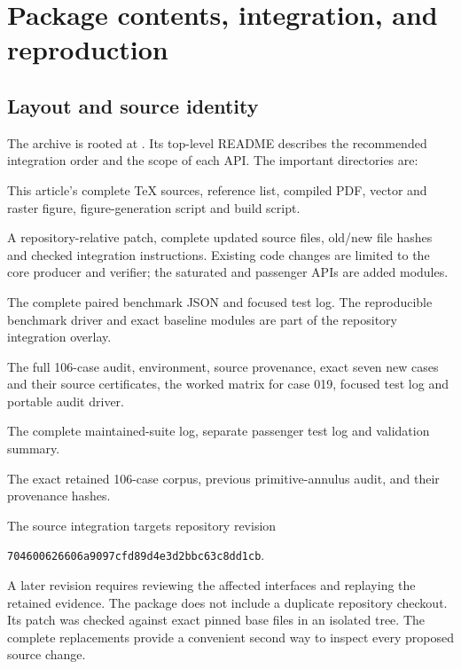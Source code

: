 \section{Package contents, integration, and reproduction}
\label{sec:reproduction}

\subsection{Layout and source identity}

The archive is rooted at
.
Its top-level README describes the recommended integration order and
the scope of each API. The important directories are:
\begin{description}[style=nextline,leftmargin=1em]
\item[\path{article/}]
This article's complete TeX sources, reference list, compiled PDF,
vector and raster figure, figure-generation script and build script.
\item[\path{integration/}]
A repository-relative patch, complete updated source files, old/new
file hashes and checked integration instructions. Existing code changes
are limited to the core producer and verifier; the saturated and
passenger APIs are added modules.
\item[\path{artifacts/column_cancellation/}]
The complete paired benchmark JSON and focused test log.
The reproducible benchmark driver and exact baseline modules are part
of the repository integration overlay.
\item[\path{artifacts/saturated/}]
The full 106-case audit, environment, source provenance, exact seven
new cases and their source certificates, the worked matrix for case 019,
focused test log and portable audit driver.
\item[\path{artifacts/validation/}]
The complete maintained-suite log, separate passenger test log and
validation summary.
\item[\path{artifacts/source/}]
The exact retained 106-case corpus, previous primitive-annulus audit,
and their provenance hashes.
\end{description}

The source integration targets repository revision
\begin{center}\texttt{704600626606a9097cfd89d4e3d2bbc63c8dd1cb}.\end{center}
A later revision
requires reviewing the affected interfaces and replaying the retained
evidence. The package does not include a duplicate repository checkout.
Its patch was checked against exact pinned base files in an isolated
tree. The complete replacements provide a convenient second way to
inspect every proposed source change.


